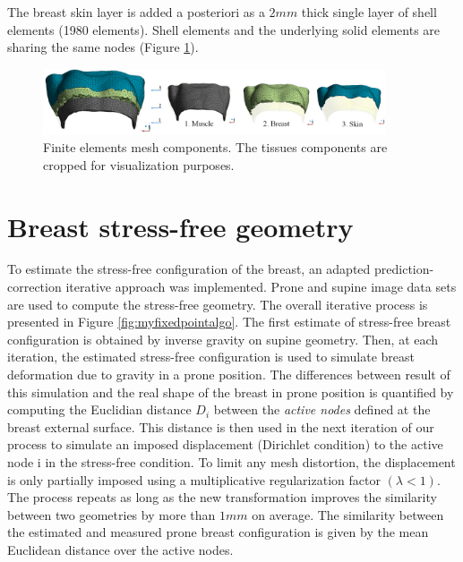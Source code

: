 The breast skin layer is added a posteriori   as a $2mm$ thick single layer of shell elements (1980 elements). Shell elements and the underlying solid elements are sharing the same nodes (Figure \ref{fig:meshcomponents}).

\begin{figure}[!h]
\centering
\includegraphics[width=0.9\textwidth,keepaspectratio]{figures/mesh3components.png} 
\caption{Finite elements mesh components. The tissues components are cropped for visualization purposes.}\label{fig:meshcomponents}
\end{figure} 

\section{Breast stress-free geometry}\label{section:myStressFree}
To estimate the stress-free configuration of the breast, an adapted prediction-correction iterative approach was implemented. Prone and supine image data sets are used to compute the stress-free geometry. The overall iterative process is presented in Figure \ref{fig:myfixedpointalgo}. The first estimate of stress-free breast configuration is obtained by inverse gravity on supine geometry. Then, at each iteration, the estimated stress-free configuration is used to simulate breast deformation due to gravity in a prone position. The differences between result of this simulation and the real shape of the breast in prone position is quantified by computing the Euclidian distance $D_i$ between the \textit{active nodes} defined at the breast external surface. This distance is then used in the next iteration of our process to simulate an imposed displacement (Dirichlet condition) to the active node i in the stress-free condition. To limit any mesh distortion, the displacement is only partially imposed using a multiplicative regularization factor $ (\lambda<1)$. The process repeats as long as the new transformation improves the similarity between two geometries by more than $1mm$ on average. The similarity between the estimated and measured prone breast configuration is given by the mean Euclidean distance over the active nodes.                                                              

